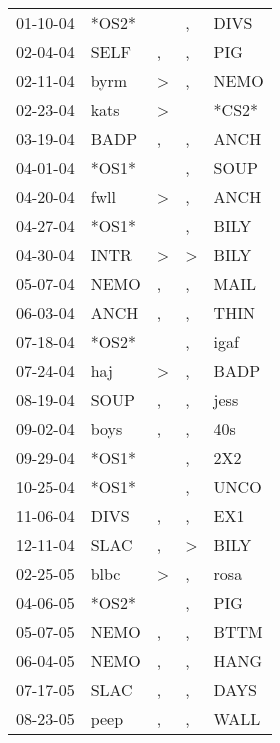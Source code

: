 \begin{supertabular}{lllll}
 01-10-04 &  *OS2* &                  &             , &   DIVS \\
 02-04-04 &   SELF &                , &             , &    PIG \\
 02-11-04 &   byrm &     \textgreater &             , &   NEMO \\
 02-23-04 &   kats &     \textgreater &               &  *CS2* \\
 03-19-04 &   BADP &                , &             , &   ANCH \\
 04-01-04 &  *OS1* &                  &             , &   SOUP \\
 04-20-04 &   fwll &     \textgreater &             , &   ANCH \\
 04-27-04 &  *OS1* &                  &             , &   BILY \\
 04-30-04 &   INTR &     \textgreater &  \textgreater &   BILY \\
 05-07-04 &   NEMO &                , &             , &   MAIL \\
 06-03-04 &   ANCH &                , &             , &   THIN \\
 07-18-04 &  *OS2* &                  &             , &   igaf \\
 07-24-04 &    haj &     \textgreater &             , &   BADP \\
 08-19-04 &   SOUP &                , &             , &   jess \\
 09-02-04 &   boys &                , &             , &    40s \\
 09-29-04 &  *OS1* &                  &             , &    2X2 \\
 10-25-04 &  *OS1* &                  &             , &   UNCO \\
 11-06-04 &   DIVS &                , &             , &    EX1 \\
 12-11-04 &   SLAC &                , &  \textgreater &   BILY \\
 02-25-05 &   blbc &     \textgreater &             , &   rosa \\
 04-06-05 &  *OS2* &                  &             , &    PIG \\
 05-07-05 &   NEMO &                , &             , &   BTTM \\
 06-04-05 &   NEMO &                , &             , &   HANG \\
 07-17-05 &   SLAC &                , &             , &   DAYS \\
 08-23-05 &   peep &                , &             , &   WALL \\

\end{supertabular}
